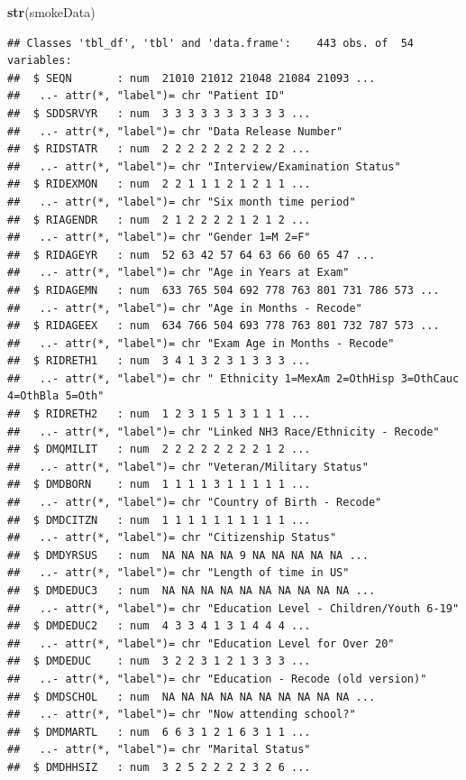 \documentclass[
]{book}
\newenvironment{Shaded}{\begin{snugshade}}{\end{snugshade}}
\newcommand{\KeywordTok}[1]{\textcolor[rgb]{0.13,0.29,0.53}{\textbf{#1}}}
\newcommand{\NormalTok}[1]{#1}
\theoremstyle{definition}
\theoremstyle{definition}
\theoremstyle{definition}
\theoremstyle{remark}
\begin{document}
\begin{Shaded}
\begin{Highlighting}[]
\KeywordTok{str}\NormalTok{(smokeData)}
\end{Highlighting}
\end{Shaded}

\begin{verbatim}
## Classes 'tbl_df', 'tbl' and 'data.frame':    443 obs. of  54 variables:
##  $ SEQN       : num  21010 21012 21048 21084 21093 ...
##   ..- attr(*, "label")= chr "Patient ID"
##  $ SDDSRVYR   : num  3 3 3 3 3 3 3 3 3 3 ...
##   ..- attr(*, "label")= chr "Data Release Number"
##  $ RIDSTATR   : num  2 2 2 2 2 2 2 2 2 2 ...
##   ..- attr(*, "label")= chr "Interview/Examination Status"
##  $ RIDEXMON   : num  2 2 1 1 1 2 1 2 1 1 ...
##   ..- attr(*, "label")= chr "Six month time period"
##  $ RIAGENDR   : num  2 1 2 2 2 2 1 2 1 2 ...
##   ..- attr(*, "label")= chr "Gender 1=M 2=F"
##  $ RIDAGEYR   : num  52 63 42 57 64 63 66 60 65 47 ...
##   ..- attr(*, "label")= chr "Age in Years at Exam"
##  $ RIDAGEMN   : num  633 765 504 692 778 763 801 731 786 573 ...
##   ..- attr(*, "label")= chr "Age in Months - Recode"
##  $ RIDAGEEX   : num  634 766 504 693 778 763 801 732 787 573 ...
##   ..- attr(*, "label")= chr "Exam Age in Months - Recode"
##  $ RIDRETH1   : num  3 4 1 3 2 3 1 3 3 3 ...
##   ..- attr(*, "label")= chr " Ethnicity 1=MexAm 2=OthHisp 3=OthCauc 4=OthBla 5=Oth"
##  $ RIDRETH2   : num  1 2 3 1 5 1 3 1 1 1 ...
##   ..- attr(*, "label")= chr "Linked NH3 Race/Ethnicity - Recode"
##  $ DMQMILIT   : num  2 2 2 2 2 2 2 2 1 2 ...
##   ..- attr(*, "label")= chr "Veteran/Military Status"
##  $ DMDBORN    : num  1 1 1 1 3 1 1 1 1 1 ...
##   ..- attr(*, "label")= chr "Country of Birth - Recode"
##  $ DMDCITZN   : num  1 1 1 1 1 1 1 1 1 1 ...
##   ..- attr(*, "label")= chr "Citizenship Status"
##  $ DMDYRSUS   : num  NA NA NA NA 9 NA NA NA NA NA ...
##   ..- attr(*, "label")= chr "Length of time in US"
##  $ DMDEDUC3   : num  NA NA NA NA NA NA NA NA NA NA ...
##   ..- attr(*, "label")= chr "Education Level - Children/Youth 6-19"
##  $ DMDEDUC2   : num  4 3 3 4 1 3 1 4 4 4 ...
##   ..- attr(*, "label")= chr "Education Level for Over 20"
##  $ DMDEDUC    : num  3 2 2 3 1 2 1 3 3 3 ...
##   ..- attr(*, "label")= chr "Education - Recode (old version)"
##  $ DMDSCHOL   : num  NA NA NA NA NA NA NA NA NA NA ...
##   ..- attr(*, "label")= chr "Now attending school?"
##  $ DMDMARTL   : num  6 6 3 1 2 1 6 3 1 1 ...
##   ..- attr(*, "label")= chr "Marital Status"
##  $ DMDHHSIZ   : num  3 2 5 2 2 2 2 3 2 6 ...

\end{verbatim}
\end{document}
